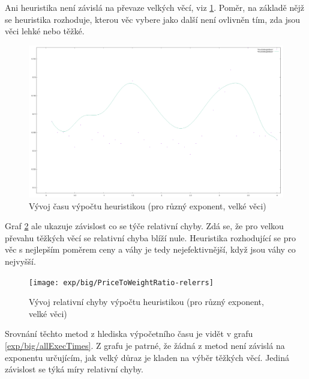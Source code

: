 \documentclass[12pt,a4paper]{article}
\begin{document}
Ani heuristika není závislá na převaze velkých věcí, viz \ref{exp/big/PriceToWeightRatio}. Poměr, na základě nějž se heuristika rozhoduje, kterou věc vybere jako další není ovlivněn tím, zda jsou věci lehké nebo těžké.

\begin{figure}[H]
\begin{center}
\includegraphics[width=\textwidth]{exp/big/PriceToWeightRatio}
\caption{Vývoj času výpočtu heuristikou (pro různý exponent, velké věci)}
\label{exp/big/PriceToWeightRatio}
\end{center}
\end{figure}

Graf \ref{exp/big/PriceToWeightRatio-relerrs} ale ukazuje závislost co se týče relativní chyby. Zdá se, že pro velkou převahu těžkých věcí se relativní chyba blíží nule. Heuristika rozhodující se pro věc s nejlepším poměrem ceny a váhy je tedy nejefektivnější, když jsou váhy co nejvyšší. 

\begin{figure}[H]
\begin{center}
\texttt{[image: exp/big/PriceToWeightRatio-relerrs]}
\caption{Vývoj relativní chyby výpočtu heuristikou (pro různý exponent, velké věci)}
\label{exp/big/PriceToWeightRatio-relerrs}
\end{center}
\end{figure}

Srovnání těchto metod z hlediska výpočetního času je vidět v grafu \ref{exp/big/allExecTimes}. Z grafu je patrné, že žádná z metod není závislá na exponentu určujícím, jak velký důraz je kladen na výběr těžkých věcí. Jediná závislost se týká míry relativní chyby.
\end{document}
